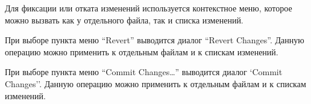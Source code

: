\documentclass[a4paper,12pt]{article}
\begin{document}
Для фиксации или отката изменений используется контекстное меню, которое можно
вызвать как у отдельного файла, так и списка изменений.

При выборе пункта меню ``Revert'' выводится диалог ``Revert Changes''. Данную
операцию можно применить к отдельным файлам и к спискам изменений.
\begin{figure}[h!]
	\begin{minipage}[h]{0.49\linewidth}
	\end{minipage}
	\hfill
	\begin{minipage}[h]{0.49\linewidth}
	\end{minipage}
\end{figure}

При выборе пункта меню ``Commit Changes\ldots'' выводится диалог `Commit 
Changes''.
Данную операцию можно применить к отдельным файлам и к спискам изменений.
\end{document}
